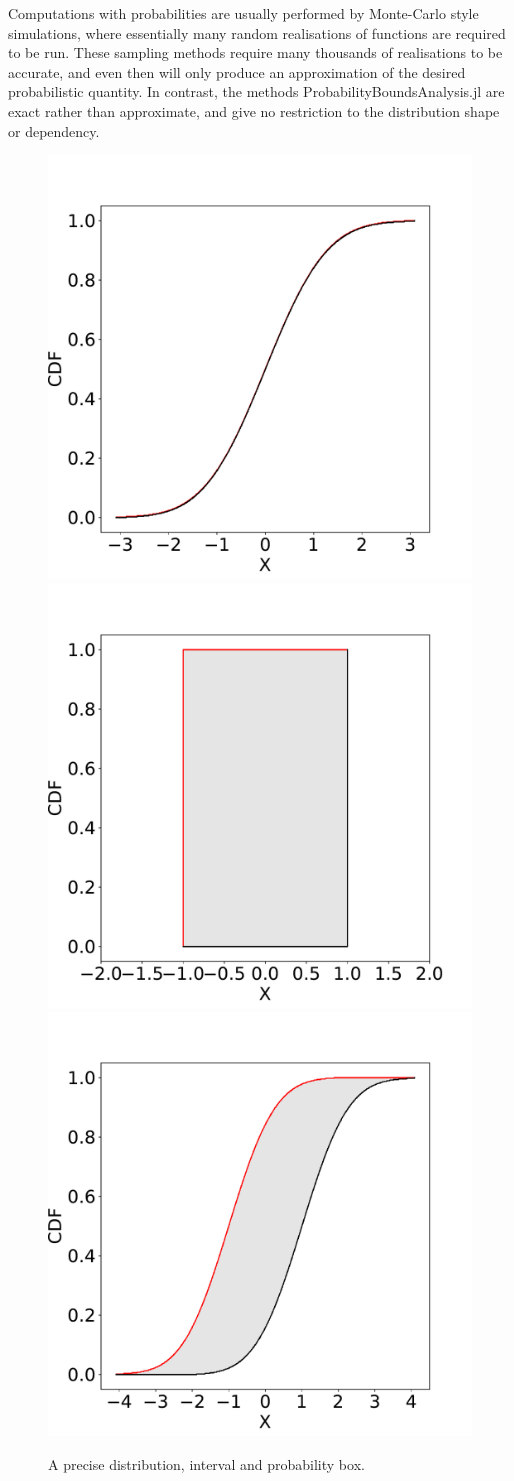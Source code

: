 \documentclass{juliacon}
\begin{document}
Computations with probabilities are usually performed by Monte-Carlo style simulations, where essentially many random realisations of functions are required to be run. These sampling methods require many thousands of realisations to be accurate, and even then will only produce an approximation of the desired probabilistic quantity. In contrast, the methods ProbabilityBoundsAnalysis.jl are exact rather than approximate, and give no restriction to the distribution shape or dependency.
\fi
\begin{figure}[htp]

  \centering
  \includegraphics[width=.3\textwidth]{../examples/JuliaCon/fig1/fig1_dist.pdf}\hfill
  \includegraphics[width=.3\textwidth]{../examples/JuliaCon/fig1/fig1_interval.pdf}\hfill
  \includegraphics[width=.3\textwidth]{../examples/JuliaCon/fig1/fig1_pbox.pdf}
  
  \caption{A precise distribution, interval and probability box.}
  \label{fig:figure1}
  
\end{figure}
\end{document}
